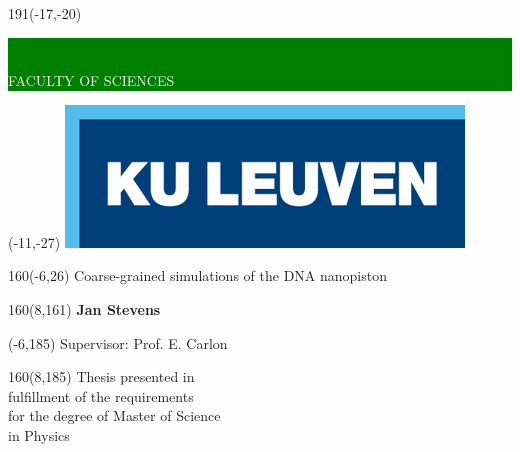 \thispagestyle{empty}
\newcommand{\form}[1]{\scalebox{1.087}{\boldmath{#1}}}
\sffamily
%
\begin{textblock}{191}(-17,-20)
    \colorbox{green}{\hspace{123mm}\
    \hspace{20mm}\parbox[c][18truemm]{48mm}{\textcolor{white}{FACULTY OF SCIENCES}}}
\end{textblock}
%
\begin{textblock}{70}(-11,-27)
\textblockcolour{}
\includegraphics*[height=19.8truemm]{Figures/LogoKULeuven}
\end{textblock}
%
\begin{textblock}{160}(-6,26)
\textblockcolour{}
\vspace{-\parskip}
\flushleft
\fontsize{40}{38}\selectfont \textcolor{bluetitle}{Coarse-grained simulations of the DNA
nanopiston}\\[1.5mm]
\end{textblock}
%
%
\begin{textblock}{160}(8,161)
\textblockcolour{}
\vspace{-\parskip}
\flushright
\fontsize{14}{16}\selectfont \textbf{Jan Stevens}
\end{textblock}
%
\begin{textblock}{70}(-6,185)
\textblockcolour{}
\vspace{-\parskip}
\flushleft
Supervisor: Prof. E. Carlon\\[-2pt]
\end{textblock}
%
\begin{textblock}{160}(8,185)
\textblockcolour{}
\vspace{-\parskip}
\flushright
Thesis presented in\\[4.5pt]
fulfillment of the requirements\\[4.5pt]
for the degree of Master of Science\\[4.5pt]
in Physics
\end{textblock}
